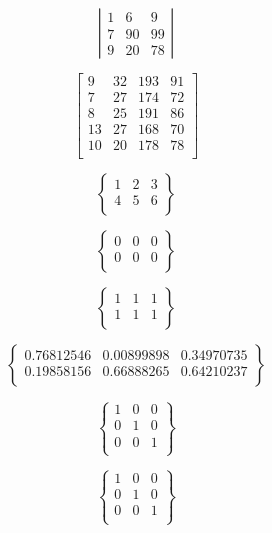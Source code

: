 \documentclass[UTF8,16pt]{ctexart}
\begin{document}
\[ 
\left|\begin{array}{cccc} 
    1 &    6    & 9 \\ 
    7 &    90   & 99\\ 
    9 &    20   & 78 
\end{array}\right| 
\]


{\color{white} \huge
$$
\left[
 \begin{matrix}
   9 & 32 & 193 & 91\\
   7 & 27 & 174 & 72\\
   8 & 25 & 191 & 86\\
   13 & 27 & 168 & 70\\
   10 & 20 & 178 & 78\\
  \end{matrix}
  \right]
$$
 }

{\color{white} \Huge
$$
\left\{
 \begin{matrix}
   1 & 2 & 3\\
   4 & 5 & 6\\
  \end{matrix}
  \right\} 
$$
 }

{\color{white} \Huge
$$
\left\{
 \begin{matrix}
   0 & 0 & 0\\
   0 & 0 & 0\\
  \end{matrix}
  \right\} 
$$
 }

{\color{white} \Huge
$$
\left\{
 \begin{matrix}
   1 & 1 & 1\\
   1 & 1 & 1\\
  \end{matrix}
  \right\} 
$$
 }

{\color{white} \Huge
$$
\left\{
 \begin{matrix}
   0.76812546 & 0.00899898 & 0.34970735\\
   0.19858156 & 0.66888265 & 0.64210237\\
  \end{matrix}
  \right\} 
$$
 }

{\color{white} \Huge
$$
\left\{
 \begin{matrix}
   1 & 0 & 0\\
   0 & 1 & 0\\
   0 & 0 & 1\\
  \end{matrix}
  \right\} 
$$
 }

{\color{white} \Huge
$$
\left\{
 \begin{matrix}
   1 & 0 & 0\\ 

   0 & 1 & 0\\

   0 & 0 & 1\\
  \end{matrix}
  \right\} 
$$
 }
\end{document}
